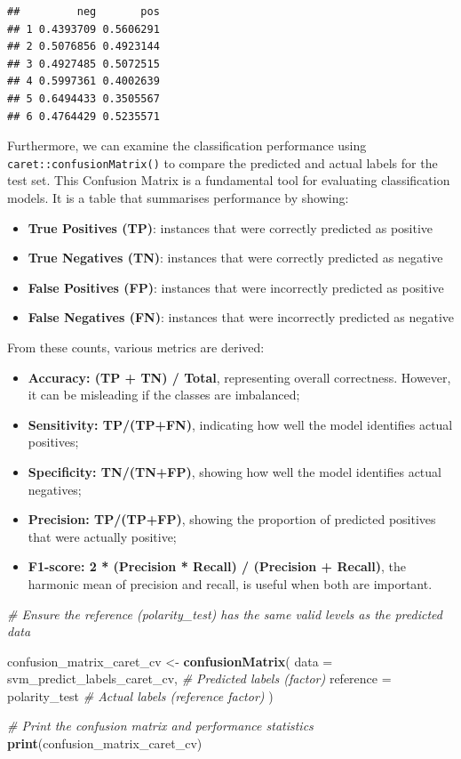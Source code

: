 \documentclass[
]{book}
\newenvironment{Shaded}{\begin{snugshade}}{\end{snugshade}}
\newcommand{\AttributeTok}[1]{\textcolor[rgb]{0.13,0.29,0.53}{#1}}
\newcommand{\CommentTok}[1]{\textcolor[rgb]{0.56,0.35,0.01}{\textit{#1}}}
\newcommand{\FunctionTok}[1]{\textcolor[rgb]{0.13,0.29,0.53}{\textbf{#1}}}
\newcommand{\NormalTok}[1]{#1}
\newcommand{\OtherTok}[1]{\textcolor[rgb]{0.56,0.35,0.01}{#1}}
\providecommand{\tightlist}{%
  \setlength{\itemsep}{0pt}\setlength{\parskip}{0pt}}
\begin{document}
\begin{verbatim}
##         neg       pos
## 1 0.4393709 0.5606291
## 2 0.5076856 0.4923144
## 3 0.4927485 0.5072515
## 4 0.5997361 0.4002639
## 5 0.6494433 0.3505567
## 6 0.4764429 0.5235571
\end{verbatim}

Furthermore, we can examine the classification performance using \texttt{caret::confusionMatrix()} to compare the predicted and actual labels for the test set. This Confusion Matrix is a fundamental tool for evaluating classification models. It is a table that summarises performance by showing:

\begin{itemize}
\tightlist
\item
  \textbf{True Positives (TP)}: instances that were correctly predicted as positive
\item
  \textbf{True Negatives (TN)}: instances that were correctly predicted as negative
\item
  \textbf{False Positives (FP)}: instances that were incorrectly predicted as positive
\item
  \textbf{False Negatives (FN)}: instances that were incorrectly predicted as negative
\end{itemize}

From these counts, various metrics are derived:

\begin{itemize}
\tightlist
\item
  \textbf{Accuracy: (TP + TN) / Total}, representing overall correctness. However, it can be misleading if the classes are imbalanced;
\item
  \textbf{Sensitivity: TP/(TP+FN)}, indicating how well the model identifies actual positives;
\item
  \textbf{Specificity: TN/(TN+FP)}, showing how well the model identifies actual negatives;
\item
  \textbf{Precision: TP/(TP+FP)}, showing the proportion of predicted positives that were actually positive;
\item
  \textbf{F1-score: 2 * (Precision * Recall) / (Precision + Recall)}, the harmonic mean of precision and recall, is useful when both are important.
\end{itemize}

\begin{Shaded}
\begin{Highlighting}[]
\CommentTok{\# Ensure the reference (polarity\_test) has the same valid levels as the predicted data}

\NormalTok{confusion\_matrix\_caret\_cv }\OtherTok{\textless{}{-}} \FunctionTok{confusionMatrix}\NormalTok{(}
  \AttributeTok{data =}\NormalTok{ svm\_predict\_labels\_caret\_cv, }\CommentTok{\# Predicted labels (factor)}
  \AttributeTok{reference =}\NormalTok{ polarity\_test            }\CommentTok{\# Actual labels (reference factor)}
\NormalTok{)}

\CommentTok{\# Print the confusion matrix and performance statistics}
\FunctionTok{print}\NormalTok{(confusion\_matrix\_caret\_cv)}
\end{Highlighting}
\end{Shaded}
\end{document}
